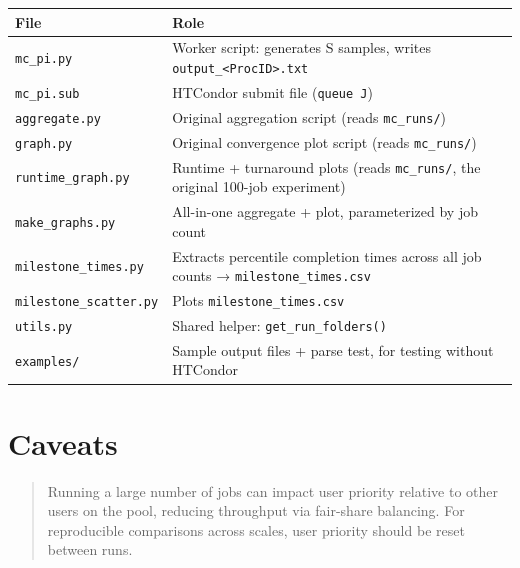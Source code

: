 \documentclass[
]{article}
\begin{document}
\begin{longtable}[]{@{}
  >{\raggedright\arraybackslash}p{}
  >{\raggedright\arraybackslash}p{}@{}}
\toprule\noalign{}
\begin{minipage}[b]{\linewidth}\raggedright
File
\end{minipage} & \begin{minipage}[b]{\linewidth}\raggedright
Role
\end{minipage} \\
\midrule\noalign{}
\endhead
\bottomrule\noalign{}
\endlastfoot
\texttt{mc\_pi.py} & Worker script: generates S samples, writes
\texttt{output\_\textless{}ProcID\textgreater{}.txt} \\
\texttt{mc\_pi.sub} & HTCondor submit file (\texttt{queue\ J}) \\
\texttt{aggregate.py} & Original aggregation script (reads
\texttt{mc\_runs/}) \\
\texttt{graph.py} & Original convergence plot script (reads
\texttt{mc\_runs/}) \\
\texttt{runtime\_graph.py} & Runtime + turnaround plots (reads
\texttt{mc\_runs/}, the original 100-job experiment) \\
\texttt{make\_graphs.py} & All-in-one aggregate + plot, parameterized by
job count \\
\texttt{milestone\_times.py} & Extracts percentile completion times
across all job counts → \texttt{milestone\_times.csv} \\
\texttt{milestone\_scatter.py} & Plots \texttt{milestone\_times.csv} \\
\texttt{utils.py} & Shared helper: \texttt{get\_run\_folders()} \\
\texttt{examples/} & Sample output files + parse test, for testing
without HTCondor \\
\end{longtable}

\section{Caveats}\label{caveats}

\begin{quote}
Running a large number of jobs can impact user priority relative to
other users on the pool, reducing throughput via fair-share balancing.
For reproducible comparisons across scales, user priority should be
reset between runs.
\end{quote}
\end{document}
